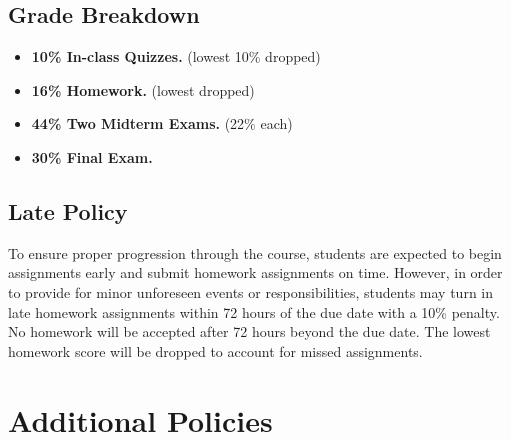 \documentclass[9pt]{article}
\begin{document}
\subsection*{Grade Breakdown}

\begin{itemize}[noitemsep]
    \item \textbf{10\% In-class Quizzes.} (lowest 10\% dropped)
    \item \textbf{16\% Homework.} (lowest dropped)
    \item \textbf{44\% Two Midterm Exams.} (22\% each)
    \item \textbf{30\% Final Exam.}
\end{itemize}

\subsection*{Late Policy}

To ensure proper progression through the course, students are expected to begin assignments early and submit homework assignments on time. However, in order to provide for minor unforeseen events or responsibilities, students may turn in late homework assignments within 72 hours of the due date with a 10\% penalty. No homework will be accepted after 72 hours beyond the due date. The lowest homework score will be dropped to account for missed assignments.

\section*{Additional Policies}

{\small
    
}
\end{document}
